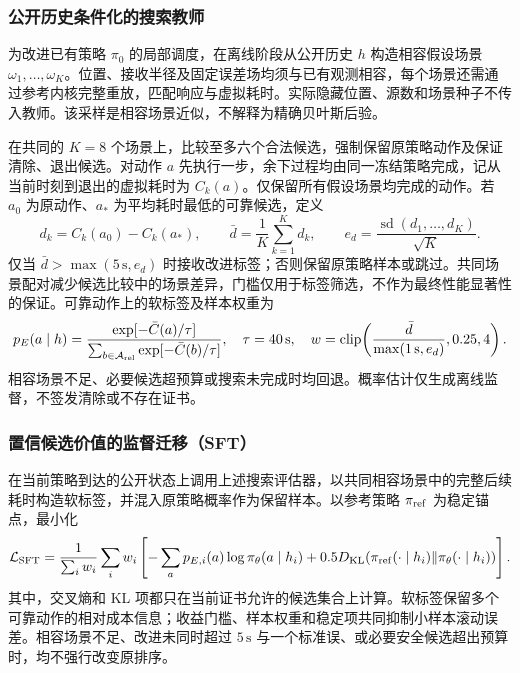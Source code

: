 \subsubsection{公开历史条件化的搜索教师}
为改进已有策略 $\pi_0$ 的局部调度，在离线阶段从公开历史 $h$ 构造相容假设场景 $\omega_1,\ldots,\omega_K$。位置、接收半径及固定误差场均须与已有观测相容，每个场景还需通过参考内核完整重放，匹配响应与虚拟耗时。实际隐藏位置、源数和场景种子不传入教师。该采样是相容场景近似，不解释为精确贝叶斯后验。

在共同的 $K=8$ 个场景上，比较至多六个合法候选，强制保留原策略动作及保证清除、退出候选。对动作 $a$ 先执行一步，余下过程均由同一冻结策略完成，记从当前时刻到退出的虚拟耗时为 $C_k(a)$。仅保留所有假设场景均完成的动作。若 $a_0$ 为原动作、$a_*$ 为平均耗时最低的可靠候选，定义
\begin{equation}
 d_k=C_k(a_0)-C_k(a_*),\qquad
 \bar d=\frac1K\sum_{k=1}^{K}d_k,\qquad
 e_d=\frac{\operatorname{sd}(d_1,\ldots,d_K)}{\sqrt K}.
\end{equation}
仅当 $\bar d>\max(5\,\mathrm{s},e_d)$ 时接收改进标签；否则保留原策略样本或跳过。共同场景配对减少候选比较中的场景差异，门槛仅用于标签筛选，不作为最终性能显著性的保证。可靠动作上的软标签及样本权重为
\begin{equation}
 p_E(a\mid h)=\frac{\exp[-\bar C(a)/\tau]}{\sum_{b\in\mathcal A_{\rm rel}}\exp[-\bar C(b)/\tau]},
 \quad \tau=40\,\mathrm{s},\quad
 w=\operatorname{clip}\!\left(\frac{\bar d}{\max(1\,\mathrm{s},e_d)},0.25,4\right).
\end{equation}
相容场景不足、必要候选超预算或搜索未完成时均回退。概率估计仅生成离线监督，不签发清除或不存在证书。

\subsubsection{置信候选价值的监督迁移（SFT）}
在当前策略到达的公开状态上调用上述搜索评估器，以共同相容场景中的完整后续耗时构造软标签，并混入原策略概率作为保留样本。以参考策略 $\pi_{\rm ref}$ 为稳定锚点，最小化
\begin{equation}
 \mathcal L_{\rm SFT}=\frac{1}{\sum_iw_i}\sum_iw_i\left[-\sum_a p_{E,i}(a)\log\pi_\theta(a\mid h_i)
 +0.5D_{\rm KL}(\pi_{\rm ref}(\cdot\mid h_i)\Vert\pi_\theta(\cdot\mid h_i))\right].
\end{equation}
其中，交叉熵和 KL 项都只在当前证书允许的候选集合上计算。软标签保留多个可靠动作的相对成本信息；收益门槛、样本权重和稳定项共同抑制小样本滚动误差。相容场景不足、改进未同时超过 $5\,\mathrm{s}$ 与一个标准误、或必要安全候选超出预算时，均不强行改变原排序。

